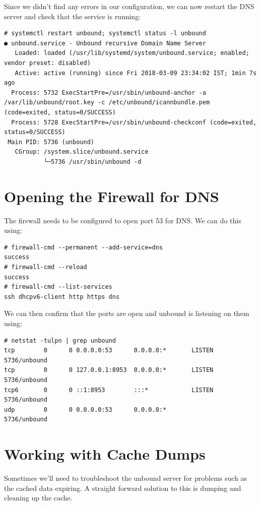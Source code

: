 \noindent
Since we didn't find any errors in our configuration, we can now restart the DNS server and check that the service is running:

\vspace{-15pt}
\begin{verbatim}
# systemctl restart unbound; systemctl status -l unbound
● unbound.service - Unbound recursive Domain Name Server
   Loaded: loaded (/usr/lib/systemd/system/unbound.service; enabled; vendor preset: disabled)
   Active: active (running) since Fri 2018-03-09 23:34:02 IST; 1min 7s ago
  Process: 5732 ExecStartPre=/usr/sbin/unbound-anchor -a /var/lib/unbound/root.key -c /etc/unbound/icannbundle.pem (code=exited, status=0/SUCCESS)
  Process: 5728 ExecStartPre=/usr/sbin/unbound-checkconf (code=exited, status=0/SUCCESS)
 Main PID: 5736 (unbound)
   CGroup: /system.slice/unbound.service
           └─5736 /usr/sbin/unbound -d
\end{verbatim}	 

	\section{Opening the Firewall for DNS}
The firewall needs to be configured to open port 53 for DNS. We can do this using:

\vspace{-15pt}
\begin{verbatim}
# firewall-cmd --permanent --add-service=dns 
success
# firewall-cmd --reload
success
# firewall-cmd --list-services 
ssh dhcpv6-client http https dns
\end{verbatim}
\vspace{-10pt}	

\noindent
We can then confirm that the ports are open and unbound is listening on them using:

\vspace{-15pt}
\begin{verbatim}
# netstat -tulpn | grep unbound
tcp        0      0 0.0.0.0:53      0.0.0.0:*       LISTEN     5736/unbound        
tcp        0      0 127.0.0.1:8953  0.0.0.0:*       LISTEN     5736/unbound        
tcp6       0      0 ::1:8953        :::*            LISTEN     5736/unbound        
udp        0      0 0.0.0.0:53      0.0.0.0:*                  5736/unbound 
\end{verbatim}
\vspace{-10pt}	

	\section{Working with Cache Dumps}
Sometimes we'll need to troubleshoot the unbound server for problems such as the cached data expiring. A straight forward solution to this is dumping and cleaning up the cache. 

